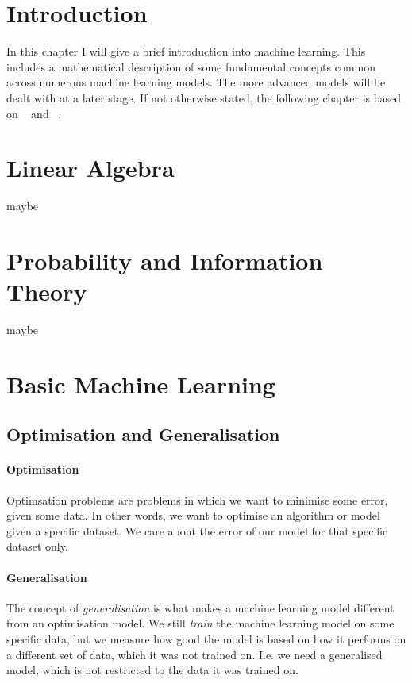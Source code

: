 %
%

\section{Introduction}
In this chapter I will give a brief introduction into machine learning. This includes a mathematical description of some fundamental concepts common across numerous machine learning models. The more advanced models will be dealt with at a later stage. If not otherwise stated, the following chapter is based on ~\cite{Goodfellow-et-al-2016} and ~\cite{hastie2009elements}. 

\section{Linear Algebra}
maybe

\section{Probability and Information Theory}
maybe

\section{Basic Machine Learning}

    \subsection{Optimisation and Generalisation}
        \paragraph{Optimisation}
        Optimsation problems are problems in which we want to minimise some error, given some data. In other words, we want to optimise an algorithm or model given a specific dataset. We care about the error of our model for that specific dataset only.

        \paragraph{Generalisation}
        The concept of \textit{generalisation} is what makes a machine learning model different from an optimisation model. We still \textit{train} the machine learning model on some specific data, but we measure how good the model is based on how it performs on a different set of data, which it was not trained on. I.e. we need a generalised model, which is not restricted to the data it was trained on.

